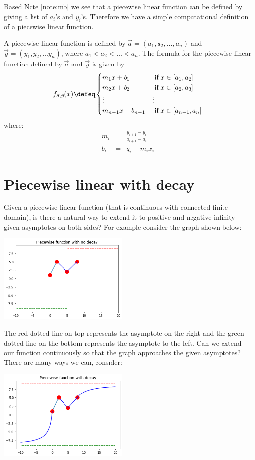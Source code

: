 \documentclass[10pt]{article}
\begin{document}
Based Note \ref{note:mb} we see that a piecewise linear function can be defined
by giving a list of $a_i$'s and $y_i$'s.  Therefore we have a simple computational
definition of a piecewise linear function.
\begin{definition}[Computational]
\label{def:computational}
A piecewise linear function is defined by $\vec{a}=(a_1,a_2,\ldots,a_n)$ and
$\vec{y}=(y_1, y_2, \ldots y_n)$, where $a_1<a_2<\ldots <a_n$.  The formula
for the piecewise linear function defined by $\vec{a}$ and $\vec{y}$ is given by
$$
f_{\vec{a},\vec{y}}(x) \defeq
\begin{cases}
m_1 x + b_1 & \hbox{ if } x \in [a_1, a_2] \\
m_2 x + b_2 & \hbox{ if } x \in [a_2, a_3] \\
\vdots & \vdots \\
m_{n-1} x + b_{n-1} & \hbox{ if } x \in [a_{n-1}, a_n]
\end{cases}
$$
where:
\begin{eqnarray*}
m_i &=& \frac{y_{i+1}-y_i}{a_{i+1}-a_i} \\
b_i &=& y_i - m_i x_i
\end{eqnarray*}
\end{definition}
\section{Piecewise linear with decay}
Given a piecewise linear function (that is continuous with connected finite
domain), is there a natural way to extend it to positive and negative infinity
given asymptotes on both sides?  For example consider the graph shown below:

\includegraphics[width=2.5in]{pw_nodecay}

The red dotted line on top represents the asymptote on the right and the green
dotted line on the bottom represents the asymptote to the left.  Can we extend
our function continuously so that the graph approaches the given asymptotes?
There are many ways we can, consider:

\includegraphics[width=2.5in]{pw_decay1a}
\end{document}
